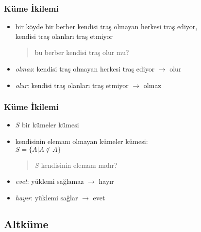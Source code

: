 \documentclass[dvipsnames]{beamer}
\theoremstyle{definition}
\theoremstyle{example}
\theoremstyle{plain}
\begin{document}
\begin{frame}
  \frametitle{Küme İkilemi}

  \begin{itemize}
    \item bir köyde bir berber kendisi traş olmayan herkesi traş ediyor,\\
      kendisi traş olanları traş etmiyor

    \begin{quote}
      bu berber kendisi traş olur mu?
    \end{quote}

    \pause
    \item \emph{olmaz}: kendisi traş olmayan herkesi traş ediyor
      $\rightarrow$ olur

    \pause
    \item \emph{olur}: kendisi traş olanları traş etmiyor
      $\rightarrow$ olmaz
  \end{itemize}
\end{frame}

\begin{frame}
  \frametitle{Küme İkilemi}

  \begin{itemize}
    \item $S$ bir kümeler kümesi

    \pause
    \item kendisinin elemanı olmayan kümeler kümesi:\\
      $S = \{ A | A \notin A \}$

    \pause
    \begin{quote}
      $S$ kendisinin elemanı mıdır?
    \end{quote}

    \pause
    \item \emph{evet}: yüklemi sağlamaz $\rightarrow$ hayır

    \pause
    \item \emph{hayır}: yüklemi sağlar $\rightarrow$ evet
  \end{itemize}
\end{frame}

\subsection{Altküme}
\end{document}
